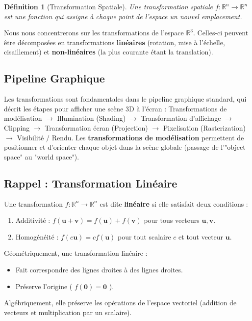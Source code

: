 \documentclass{article}
\newtheorem{definition}{Définition}
\begin{document}
\begin{definition}[Transformation Spatiale]
Une transformation spatiale $f: \mathbb{R}^n \to \mathbb{R}^n$ est une fonction qui assigne à chaque point de l'espace un nouvel emplacement.
\end{definition}
Nous nous concentrerons sur les transformations de l'espace $\mathbb{R}^3$. Celles-ci peuvent être décomposées en transformations \textbf{linéaires} (rotation, mise à l'échelle, cisaillement) et \textbf{non-linéaires} (la plus courante étant la translation).

\subsection{Pipeline Graphique}
Les transformations sont fondamentales dans le pipeline graphique standard, qui décrit les étapes pour afficher une scène 3D à l'écran :
Transformations de modélisation $\longrightarrow$ Illumination (Shading) $\longrightarrow$ Transformation d'affichage $\longrightarrow$ Clipping $\longrightarrow$ Transformation écran (Projection) $\longrightarrow$ Pixelisation (Rasterization) $\longrightarrow$ Visibilité / Rendu.
Les \textbf{transformations de modélisation} permettent de positionner et d'orienter chaque objet dans la scène globale (passage de l'"object space" au "world space").

\subsection{Rappel : Transformation Linéaire}
Une transformation $f: \mathbb{R}^n \to \mathbb{R}^n$ est dite \textbf{linéaire} si elle satisfait deux conditions :
\begin{enumerate}
    \item Additivité : $f(\mathbf{u} + \mathbf{v}) = f(\mathbf{u}) + f(\mathbf{v})$ pour tous vecteurs $\mathbf{u}, \mathbf{v}$.
    \item Homogénéité : $f(c\mathbf{u}) = cf(\mathbf{u})$ pour tout scalaire $c$ et tout vecteur $\mathbf{u}$.
\end{enumerate}
Géométriquement, une transformation linéaire :
\begin{itemize}
    \item Fait correspondre des lignes droites à des lignes droites.
    \item Préserve l'origine ( $f(\mathbf{0}) = \mathbf{0}$ ).
\end{itemize}
Algébriquement, elle préserve les opérations de l'espace vectoriel (addition de vecteurs et multiplication par un scalaire).
\end{document}
